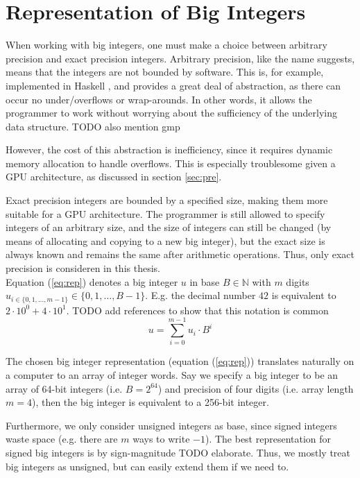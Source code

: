 \section{Representation of Big Integers}
\label{sec:big}
When working with big integers, one must make a choice between arbitrary precision and exact precision integers. Arbitrary precision, like the name suggests, means that the integers are not bounded by software. This is, for example, implemented in Haskell \cite{marlow2010haskell}, and provides a great deal of abstraction, as there can occur no under/overflows or wrap-arounds. In other words, it allows the programmer to work without worrying about the sufficiency of the underlying data structure. {\color{red} TODO also mention gmp}

However, the cost of this abstraction is inefficiency, since it requires dynamic memory allocation to handle overflows. This is especially troublesome given a GPU architecture, as discussed in section \ref{sec:pre}.

Exact precision integers are bounded by a specified size, making them more suitable for a GPU architecture. The programmer is still allowed to specify integers of an arbitrary size, and the size of integers can still be changed (by means of allocating and copying to a new big integer), but the exact size is always known and remains the same after arithmetic operations. Thus, only exact precision is consideren in this thesis.\\

Equation (\ref{eq:rep}) denotes a big integer $u$ in base $B \in \mathbb{N}$ with $m$ digits $u_{i\in \{0,1,\dots,m-1\}}\in\{0,1,\dots,B-1\}$. E.g. the decimal number $42$ is equivalent to $2\cdot 10^0+4\cdot 10^1$. {\color{red} TODO add references to show that this notation is common}
\begin{equation}
\label{eq:rep}
u = \sum_{i=0}^{m-1}u_i\cdot B^{i}
\end{equation}

The chosen big integer representation (equation (\ref{eq:rep})) translates naturally on a computer to an array of integer words. Say we specify a big integer to be an array of 64-bit integers (i.e. $B = 2^{64}$) and precision of four digits (i.e. array length $m = 4$), then the big integer is equivalent to a 256-bit integer.

Furthermore, we only consider unsigned integers as base, since signed integers waste space (e.g. there are $m$ ways to write $-1$). The best representation for signed big integers is by sign-magnitude {\color{red} TODO elaborate}. Thus, we mostly treat big integers as unsigned, but can easily extend them if we need to.


